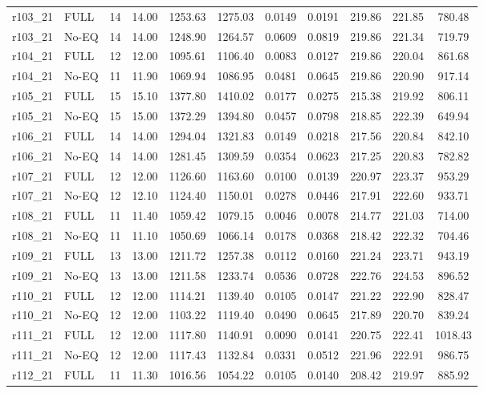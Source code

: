 \begin{longtable}{@{\extracolsep{\fill}}llccccccccc@{}}
\midrule
r103\_21 & FULL & 14 & 14.00 & 1253.63 & 1275.03 & 0.0149 & 0.0191 & 219.86 & 221.85 & 780.48 \\
r103\_21 & No-EQ & 14 & 14.00 & 1248.90 & 1264.57 & 0.0609 & 0.0819 & 219.86 & 221.34 & 719.79 \\
\midrule
r104\_21 & FULL & 12 & 12.00 & 1095.61 & 1106.40 & 0.0083 & 0.0127 & 219.86 & 220.04 & 861.68 \\
r104\_21 & No-EQ & 11 & 11.90 & 1069.94 & 1086.95 & 0.0481 & 0.0645 & 219.86 & 220.90 & 917.14 \\
\midrule
r105\_21 & FULL & 15 & 15.10 & 1377.80 & 1410.02 & 0.0177 & 0.0275 & 215.38 & 219.92 & 806.11 \\
r105\_21 & No-EQ & 15 & 15.00 & 1372.29 & 1394.80 & 0.0457 & 0.0798 & 218.85 & 222.39 & 649.94 \\
\midrule
r106\_21 & FULL & 14 & 14.00 & 1294.04 & 1321.83 & 0.0149 & 0.0218 & 217.56 & 220.84 & 842.10 \\
r106\_21 & No-EQ & 14 & 14.00 & 1281.45 & 1309.59 & 0.0354 & 0.0623 & 217.25 & 220.83 & 782.82 \\
\midrule
r107\_21 & FULL & 12 & 12.00 & 1126.60 & 1163.60 & 0.0100 & 0.0139 & 220.97 & 223.37 & 953.29 \\
r107\_21 & No-EQ & 12 & 12.10 & 1124.40 & 1150.01 & 0.0278 & 0.0446 & 217.91 & 222.60 & 933.71 \\
\midrule
r108\_21 & FULL & 11 & 11.40 & 1059.42 & 1079.15 & 0.0046 & 0.0078 & 214.77 & 221.03 & 714.00 \\
r108\_21 & No-EQ & 11 & 11.10 & 1050.69 & 1066.14 & 0.0178 & 0.0368 & 218.42 & 222.32 & 704.46 \\
\midrule
r109\_21 & FULL & 13 & 13.00 & 1211.72 & 1257.38 & 0.0112 & 0.0160 & 221.24 & 223.71 & 943.19 \\
r109\_21 & No-EQ & 13 & 13.00 & 1211.58 & 1233.74 & 0.0536 & 0.0728 & 222.76 & 224.53 & 896.52 \\
\midrule
r110\_21 & FULL & 12 & 12.00 & 1114.21 & 1139.40 & 0.0105 & 0.0147 & 221.22 & 222.90 & 828.47 \\
r110\_21 & No-EQ & 12 & 12.00 & 1103.22 & 1119.40 & 0.0490 & 0.0645 & 217.89 & 220.70 & 839.24 \\
\midrule
r111\_21 & FULL & 12 & 12.00 & 1117.80 & 1140.91 & 0.0090 & 0.0141 & 220.75 & 222.41 & 1018.43 \\
r111\_21 & No-EQ & 12 & 12.00 & 1117.43 & 1132.84 & 0.0331 & 0.0512 & 221.96 & 222.91 & 986.75 \\
\midrule
r112\_21 & FULL & 11 & 11.30 & 1016.56 & 1054.22 & 0.0105 & 0.0140 & 208.42 & 219.97 & 885.92 \\

\end{longtable}
